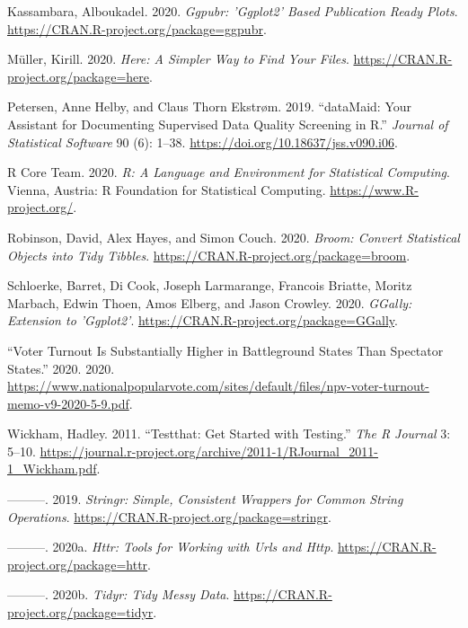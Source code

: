 \documentclass[
]{article}
\begin{document}
\leavevmode\hypertarget{ref-ggpubr}{}%
Kassambara, Alboukadel. 2020. \emph{Ggpubr: 'Ggplot2' Based Publication
Ready Plots}. \url{https://CRAN.R-project.org/package=ggpubr}.

\leavevmode\hypertarget{ref-here}{}%
Müller, Kirill. 2020. \emph{Here: A Simpler Way to Find Your Files}.
\url{https://CRAN.R-project.org/package=here}.

\leavevmode\hypertarget{ref-dataMaid}{}%
Petersen, Anne Helby, and Claus Thorn Ekstrøm. 2019. ``dataMaid: Your
Assistant for Documenting Supervised Data Quality Screening in R.''
\emph{Journal of Statistical Software} 90 (6): 1--38.
\url{https://doi.org/10.18637/jss.v090.i06}.

\leavevmode\hypertarget{ref-R}{}%
R Core Team. 2020. \emph{R: A Language and Environment for Statistical
Computing}. Vienna, Austria: R Foundation for Statistical Computing.
\url{https://www.R-project.org/}.

\leavevmode\hypertarget{ref-broom}{}%
Robinson, David, Alex Hayes, and Simon Couch. 2020. \emph{Broom: Convert
Statistical Objects into Tidy Tibbles}.
\url{https://CRAN.R-project.org/package=broom}.

\leavevmode\hypertarget{ref-GGally}{}%
Schloerke, Barret, Di Cook, Joseph Larmarange, Francois Briatte, Moritz
Marbach, Edwin Thoen, Amos Elberg, and Jason Crowley. 2020.
\emph{GGally: Extension to 'Ggplot2'}.
\url{https://CRAN.R-project.org/package=GGally}.

\leavevmode\hypertarget{ref-US_voter_turnout}{}%
``Voter Turnout Is Substantially Higher in Battleground States Than
Spectator States.'' 2020. 2020.
\url{https://www.nationalpopularvote.com/sites/default/files/npv-voter-turnout-memo-v9-2020-5-9.pdf}.

\leavevmode\hypertarget{ref-testthat}{}%
Wickham, Hadley. 2011. ``Testthat: Get Started with Testing.'' \emph{The
R Journal} 3: 5--10.
\url{https://journal.r-project.org/archive/2011-1/RJournal_2011-1_Wickham.pdf}.

\leavevmode\hypertarget{ref-stringr}{}%
---------. 2019. \emph{Stringr: Simple, Consistent Wrappers for Common
String Operations}. \url{https://CRAN.R-project.org/package=stringr}.

\leavevmode\hypertarget{ref-httr}{}%
---------. 2020a. \emph{Httr: Tools for Working with Urls and Http}.
\url{https://CRAN.R-project.org/package=httr}.

\leavevmode\hypertarget{ref-tidyr}{}%
---------. 2020b. \emph{Tidyr: Tidy Messy Data}.
\url{https://CRAN.R-project.org/package=tidyr}.
\end{document}
